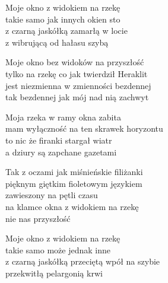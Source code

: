 \begin{text}
    Moje okno z widokiem na rzekę\\
    takie samo jak innych okien sto\\
    z czarną jaskółką zamarłą w locie\\
    z wibrującą od hałasu szybą

    Moje okno bez widoków na przyszłość\\
    tylko na rzekę co jak twierdził Heraklit\\
    jest niezmienna w zmienności bezdennej\\
    tak bezdennej jak mój nad nią zachwyt

    Moja rzeka w ramy okna zabita\\
    mam wyłączność na ten skrawek horyzontu\\
    to nic że firanki stargał wiatr\\
    a dziury są zapchane gazetami

    Tak z oczami jak miśnieńskie filiżanki\\
    pięknym giętkim fioletowym językiem\\
    zawieszony na pętli czasu\\
    na klamce okna z widokiem na rzekę\\
    nie nas przyszłość

    Moje okno z widokiem na rzekę\\
    takie samo może jednak inne\\
    z czarną jaskółką przeciętą wpół na szybie\\
    przekwitłą pelargonią krwi
\end{text}
\begin{chord}

\end{chord}